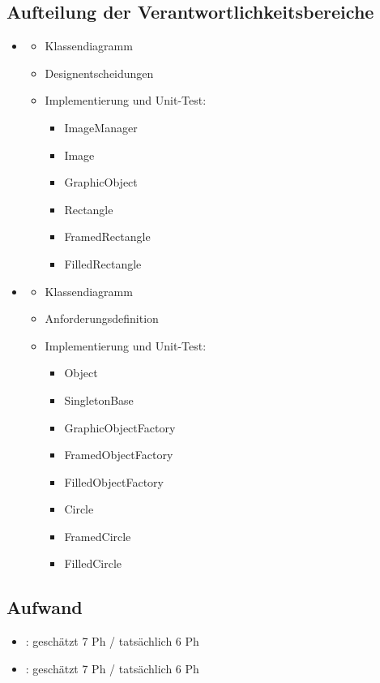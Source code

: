 \subsection{Aufteilung der Verantwortlichkeitsbereiche}
\begin{itemize}
	\item \docauthor
	\begin{itemize}
		\item Klassendiagramm
		\item Designentscheidungen
		\item Implementierung und Unit-Test:
		\begin{itemize}
			\item ImageManager
			\item Image
			\item GraphicObject
			\item Rectangle
			\item FramedRectangle
			\item FilledRectangle
		\end{itemize}
	\end{itemize}
	\item \doccoauthor
	\begin{itemize}
		\item Klassendiagramm
		\item Anforderungsdefinition
		\item Implementierung und Unit-Test:
		\begin{itemize}
			\item Object
			\item SingletonBase
			\item GraphicObjectFactory
			\item FramedObjectFactory
			\item FilledObjectFactory
			\item Circle
			\item FramedCircle
			\item FilledCircle
		\end{itemize}
	\end{itemize}	
\end{itemize}

\subsection{Aufwand}

\begin{itemize}
	\item \docauthor: geschätzt 7 Ph / tatsächlich 6 Ph
	\item \doccoauthor: geschätzt 7 Ph / tatsächlich 6 Ph
\end{itemize}

